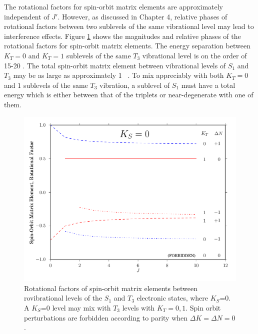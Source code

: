 \documentclass[12pt]{mitthesis}
\begin{document}
The rotational factors for spin-orbit matrix elements are
approximately independent of $J'$.  However, as discussed in Chapter
4, relative phases of rotational factors between two sublevels of the
same vibrational level may lead to interference effects.  Figure
\ref{fig:rotational-factors} shows the magnitudes and relative phases of
the rotational factors for spin-orbit matrix elements.  The energy
separation between $K_T=0$ and $K_T=1$ sublevels of the same $T_3$
vibrational level is on the order of 15-20 \rcm \cite{thom07}.  The total
spin-orbit matrix element between vibrational levels of $S_1$ and
$T_3$ may be as large as approximately 1 \rcm\ \cite{thom07}.  To mix
appreciably with both $K_T=0$ and $1$ sublevels of the same $T_3$
vibration, a sublevel of $S_1$ must have a total energy which is
either between that of the triplets or near-degenerate with one of
them.


\begin{figure}
  \caption{Rotational factors of spin-orbit matrix elements between
    rovibrational levels of the $S_1$ and $T_3$ electronic states,
    where $K_S$=0.  A $K_S$=0 level may mix with $T_3$ levels with
    $K_T=0,1$.  Spin orbit perturbations are forbidden according to
    parity when $\Delta K = \Delta N = 0$.}
  \label{fig:rotational-factors}
  \centering
  \includegraphics[width=6in]{rotational-factors-k0.pdf}
\end{figure}
\end{document}
